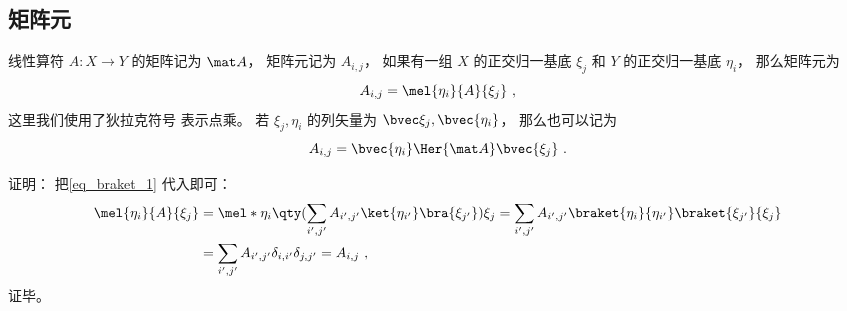\subsection{矩阵元}
线性算符 $A:X\to Y$ 的矩阵记为 $\mat A$， 矩阵元记为 $A_{i,j}$， 如果有一组 $X$ 的正交归一基底 $\xi_j$ 和 $Y$ 的正交归一基底 $\eta_i$， 那么矩阵元为
\begin{equation}
A_{i,j} = \mel{\eta_i}{A}{\xi_j}~,
\end{equation}
这里我们使用了狄拉克符号 表示点乘。 若 $\xi_j, \eta_i$ 的列矢量为 $\bvec \xi_j, \bvec {\eta_i}$， 那么也可以记为
\begin{equation}
A_{i,j} = \bvec {\eta_i}\Her {\mat A} \bvec {\xi_j}~.
\end{equation}

证明： 把\autoref{eq_braket_1} 代入即可：
\begin{equation}\label{eq_MatLS_2}
\begin{aligned}
\mel{\eta_i}{A}{\xi_j} &= \mel*{\eta_i}{\qty(\sum_{i',j'} A_{i',j'} \ket{\eta_{i'}}\bra{\xi_{j'}})}{\xi_j}
= \sum_{i',j'} A_{i',j'} \braket{\eta_i}{\eta_{i'}}\braket{\xi_{j'}}{\xi_j}\\
&= \sum_{i',j'} A_{i',j'} \delta_{i,i'}\delta_{j,j'}
= A_{i,j}~,
\end{aligned}
\end{equation}
证毕。
